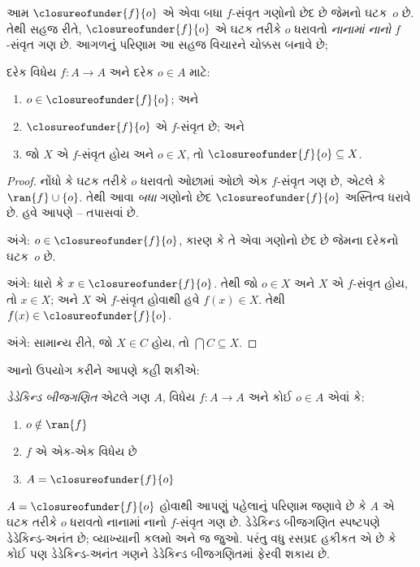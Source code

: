 આમ $\closureofunder{f}{o}$ એ એવા બધા $f$-સંવૃત ગણોનો છેદ છે
જેમનો ઘટક~$o$ છે. તેથી સહજ રીતે,
$\closureofunder{f}{o}$ એ ઘટક તરીકે $o$ ધરાવતો
\emph{નાનામાં નાનો} $f$-સંવૃત ગણ છે. આગળનું પરિણામ આ સહજ વિચારને
ચોક્કસ બનાવે છે;
\begin{lem}
	દરેક વિધેય $f \colon A \to A$ અને દરેક $o \in A$ માટે:
	\begin{enumerate}
		\item{} $o \in \closureofunder{f}{o}$; અને
		\item{} $\closureofunder{f}{o}$ એ $f$-સંવૃત છે; અને
		\item{} જો $X$ એ $f$-સંવૃત હોય અને $o \in
		X$, તો $\closureofunder{f}{o} \subseteq X$.
	\end{enumerate}
\end{lem}

\begin{proof}
નોંધો કે ઘટક તરીકે $o$ ધરાવતો ઓછામાં ઓછો એક $f$-સંવૃત ગણ
છે, એટલે કે $\ran{f}\cup \{o\}$. તેથી આવા \emph{બધા} ગણોનો છેદ
$\closureofunder{f}{o}$ અસ્તિત્વ ધરાવે છે. હવે આપણે
-- તપાસવાં છે.

 અંગે: $o \in \closureofunder{f}{o}$, કારણ કે
તે એવા ગણોનો છેદ છે જેમના દરેકનો ઘટક~$o$ છે.

 અંગે: ધારો કે $x \in \closureofunder{f}{o}$.
તેથી જો $o \in X$ અને $X$ એ $f$-સંવૃત હોય, તો $x \in X$; અને
$X$ એ $f$-સંવૃત હોવાથી હવે $f(x) \in X$. તેથી
$f(x) \in \closureofunder{f}{o}$.

 અંગે: સામાન્ય રીતે, જો $X \in C$ હોય, તો
$\bigcap C \subseteq X$.
\end{proof}

આનો ઉપયોગ કરીને આપણે કહી શકીએ:

\begin{defn}
\emph{ડેડેકિન્ડ બીજગણિત} એટલે ગણ $A$, વિધેય $f \colon A \to A$
અને કોઈ $o \in A$ એવાં કે:
	\begin{enumerate}
		\item {} $o \notin \ran{f}$
		\item {} $f$ એ એક-એક વિધેય છે
		\item {} $A = \closureofunder{f}{o}$
	\end{enumerate}
\end{defn}

$A = \closureofunder{f}{o}$ હોવાથી આપણું પહેલાનું પરિણામ જણાવે છે કે
$A$ એ ઘટક તરીકે $o$ ધરાવતો નાનામાં નાનો $f$-સંવૃત ગણ છે.
ડેડેકિન્ડ બીજગણિત સ્પષ્ટપણે ડેડેકિન્ડ-અનંત છે; વ્યાખ્યાની કલમો
 અને  જ જુઓ. પરંતુ વધુ રસપ્રદ
હકીકત એ છે કે કોઈ પણ ડેડેકિન્ડ-અનંત ગણને ડેડેકિન્ડ બીજગણિતમાં ફેરવી
શકાય છે.

